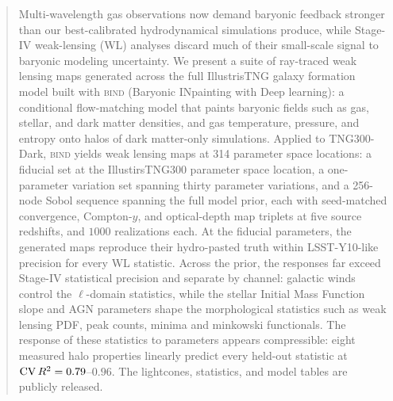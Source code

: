 \documentclass[linenumbers,trackchanges, twocolumn]{aastex701}
\begin{document}
\begin{abstract}
Multi-wavelength gas observations now demand baryonic feedback stronger than our best-calibrated hydrodynamical simulations produce, while Stage-IV weak-lensing (WL) analyses discard much of their small-scale signal to baryonic modeling uncertainty. We present a suite of ray-traced weak lensing maps generated across the full IllustrisTNG galaxy formation model  built with \textsc{bind} (Baryonic INpainting with Deep learning): a conditional flow-matching model that paints baryonic fields such as gas, stellar, and dark matter densities, and gas temperature, pressure, and entropy onto halos of dark matter-only simulations. Applied to TNG300-Dark, \textsc{bind} yields weak lensing maps at 314 parameter space locations: a fiducial set at the IllustirsTNG300 parameter space location, a one-parameter variation set spanning thirty parameter variations, and a 256-node Sobol sequence spanning the full model prior, each with seed-matched convergence, Compton-$y$, and optical-depth map triplets at five source redshifts, and $1000$ realizations each. At the fiducial parameters, the generated maps reproduce their hydro-pasted truth within LSST-Y10-like precision for every WL statistic. Across the prior, the responses far exceed Stage-IV statistical precision and separate by channel: galactic winds control the $\ell$-domain statistics, while the stellar Initial Mass Function slope and AGN parameters shape the morphological statistics such as weak lensing PDF, peak counts, minima and minkowski functionals. The response of these statistics to parameters appears compressible: eight measured halo properties linearly predict every held-out statistic at ${\rm CV}\,R^2 = 0.79$--$0.96$. The lightcones, statistics, and model tables are publicly released.
\end{abstract}

\end{document}
